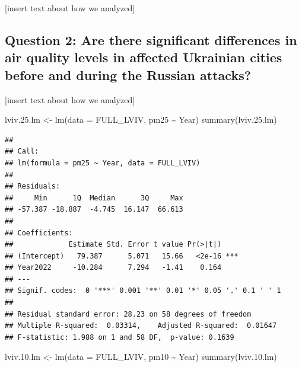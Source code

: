 \documentclass[
  12pt,
]{article}
\newenvironment{Shaded}{\begin{snugshade}}{\end{snugshade}}
\newcommand{\AttributeTok}[1]{\textcolor[rgb]{0.77,0.63,0.00}{#1}}
\newcommand{\FloatTok}[1]{\textcolor[rgb]{0.00,0.00,0.81}{#1}}
\newcommand{\FunctionTok}[1]{\textcolor[rgb]{0.00,0.00,0.00}{#1}}
\newcommand{\NormalTok}[1]{#1}
\newcommand{\OtherTok}[1]{\textcolor[rgb]{0.56,0.35,0.01}{#1}}
\newcommand{\SpecialCharTok}[1]{\textcolor[rgb]{0.00,0.00,0.00}{#1}}
\begin{document}
{[}insert text about how we analyzed{]}

\hypertarget{question-2-are-there-significant-differences-in-air-quality-levels-in-affected-ukrainian-cities-before-and-during-the-russian-attacks}{%
\subsection{Question 2: Are there significant differences in air quality
levels in affected Ukrainian cities before and during the Russian
attacks?}\label{question-2-are-there-significant-differences-in-air-quality-levels-in-affected-ukrainian-cities-before-and-during-the-russian-attacks}}

{[}insert text about how we analyzed{]}

\begin{Shaded}
\begin{Highlighting}[]
\NormalTok{lviv.}\FloatTok{25.}\NormalTok{lm }\OtherTok{\textless{}{-}} \FunctionTok{lm}\NormalTok{(}\AttributeTok{data =}\NormalTok{ FULL\_LVIV, pm25 }\SpecialCharTok{\textasciitilde{}}\NormalTok{ Year)}
\FunctionTok{summary}\NormalTok{(lviv.}\FloatTok{25.}\NormalTok{lm)}
\end{Highlighting}
\end{Shaded}

\begin{verbatim}
## 
## Call:
## lm(formula = pm25 ~ Year, data = FULL_LVIV)
## 
## Residuals:
##     Min      1Q  Median      3Q     Max 
## -57.387 -18.887  -4.745  16.147  66.613 
## 
## Coefficients:
##             Estimate Std. Error t value Pr(>|t|)    
## (Intercept)   79.387      5.071   15.66   <2e-16 ***
## Year2022     -10.284      7.294   -1.41    0.164    
## ---
## Signif. codes:  0 '***' 0.001 '**' 0.01 '*' 0.05 '.' 0.1 ' ' 1
## 
## Residual standard error: 28.23 on 58 degrees of freedom
## Multiple R-squared:  0.03314,    Adjusted R-squared:  0.01647 
## F-statistic: 1.988 on 1 and 58 DF,  p-value: 0.1639
\end{verbatim}

\begin{Shaded}
\begin{Highlighting}[]
\NormalTok{lviv.}\FloatTok{10.}\NormalTok{lm }\OtherTok{\textless{}{-}} \FunctionTok{lm}\NormalTok{(}\AttributeTok{data =}\NormalTok{ FULL\_LVIV, pm10 }\SpecialCharTok{\textasciitilde{}}\NormalTok{ Year) }
\FunctionTok{summary}\NormalTok{(lviv.}\FloatTok{10.}\NormalTok{lm) }
\end{Highlighting}
\end{Shaded}
\end{document}
